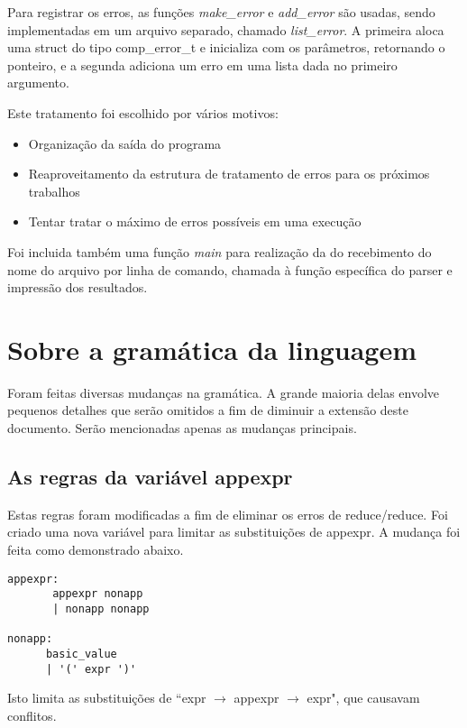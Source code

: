\documentclass[11pt]{article}
\begin{document}
Para registrar os erros, as funções \emph{make\_error} e \emph{add\_error} são usadas, sendo implementadas em um arquivo separado, chamado
\emph{list\_error}. A primeira aloca uma struct do tipo comp\_error\_t e inicializa com os parâmetros, retornando o ponteiro,
e a segunda adiciona um erro em uma lista dada no primeiro argumento.

Este tratamento foi escolhido por vários motivos:

\begin{itemize}[leftmargin=.5in]
  \item Organização da saída do programa
  \item Reaproveitamento da estrutura de tratamento de erros para os próximos trabalhos
  \item Tentar tratar o máximo de erros possíveis em uma execução
\end{itemize}

Foi incluida também uma função \emph{main} para realização da do recebimento do nome do
arquivo por linha de comando, chamada à função específica do parser e impressão dos resultados.


\section{Sobre a gramática da linguagem}

Foram feitas diversas mudanças na gramática. A grande maioria delas envolve pequenos 
detalhes que serão omitidos a fim de diminuir a extensão deste documento. 
Serão mencionadas apenas as mudanças principais.

\subsection{As regras da variável appexpr}

Estas regras foram modificadas a fim de eliminar os erros de reduce/reduce.  
Foi criado uma nova variável para limitar as substituições de appexpr.
A mudança foi feita como demonstrado abaixo.

\begin{lstlisting}[basicstyle=\small]
appexpr:
       appexpr nonapp 
       | nonapp nonapp 

nonapp:
      basic_value
      | '(' expr ')'
\end{lstlisting}

Isto limita as substituições de ``expr $\rightarrow$ appexpr $\rightarrow$ expr", que causavam conflitos.
\end{document}
